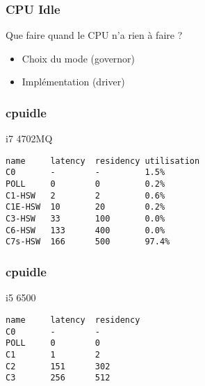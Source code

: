 \begin{frame}
	\frametitle{CPU Idle}
	\begin{block}{Que faire quand le CPU n'a rien à faire ?}
	\begin{itemize}
		\item Choix du mode (governor)
		\item Implémentation (driver)
	\end{itemize}
	\end{block}
\end{frame}

\begin{frame}[fragile]
	\frametitle{cpuidle}
	\begin{block}{i7 4702MQ }
\begin{verbatim}
name     latency  residency utilisation
C0       -        -         1.5%
POLL     0        0         0.2%
C1-HSW   2        2         0.6%
C1E-HSW  10       20        0.2%
C3-HSW   33       100       0.0%
C6-HSW   133      400       0.0%
C7s-HSW  166      500       97.4%
\end{verbatim}
		\end{block}
\end{frame}

\begin{frame}[fragile]
	\frametitle{cpuidle}
	\begin{block}{i5 6500}
\begin{verbatim}
name     latency  residency
C0       -        -         
POLL     0        0         
C1       1        2         
C2       151      302       
C3       256      512       
\end{verbatim}
		\end{block}
\end{frame}



